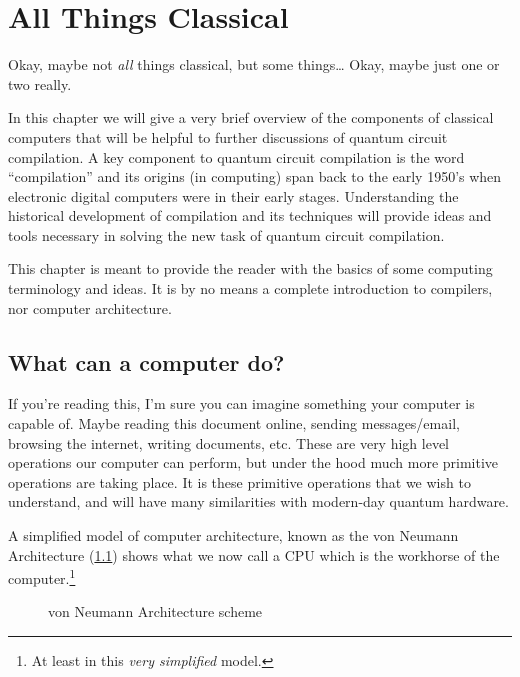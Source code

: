\chapter{All Things Classical}\label{chap:compilers}

Okay, maybe not \emph{all} things classical, but some things\dots
Okay, maybe just one or two really.

In this chapter we will give a very brief overview of the components of classical computers that will be helpful to further discussions of quantum circuit compilation.
A key component to quantum circuit compilation is the word ``compilation'' and its origins (in computing) span back to the early 1950's when electronic digital computers were in their early stages.
Understanding the historical development of compilation and its techniques will provide ideas and tools necessary in solving the new task of quantum circuit compilation.

This chapter is meant to provide the reader with the basics of some computing terminology and ideas.
It is by no means a complete introduction to compilers, nor computer architecture.

\section{What can a computer do?}

If you're reading this, I'm sure you can imagine something your computer is capable of.
Maybe reading this document online, sending messages/email, browsing the internet, writing documents, etc.
These are very high level operations our computer can perform, but under the hood much more primitive operations are taking place.
It is these primitive operations that we wish to understand, and will have many similarities with modern-day quantum hardware.

A simplified model of computer architecture, known as the von Neumann Architecture (\cref{fig:comparch}) shows what we now call a \ac{CPU} which is the workhorse of the computer.\footnote{At least in this \emph{very simplified} model.}

\begin{figure}[h]
    \centering
    
    \caption{von Neumann Architecture scheme}\label{fig:comparch}
\end{figure}


